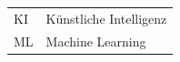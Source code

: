 
\noindent
\begin{tabularx}{\textwidth}{lX}
KI & Künstliche Intelligenz\\
ML & Machine Learning
\end{tabularx}
